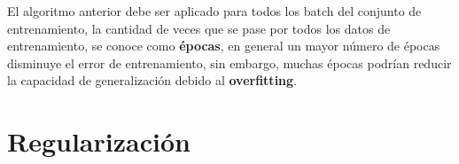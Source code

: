 \begin{remark}
	El algoritmo anterior debe ser aplicado para todos los batch del conjunto de entrenamiento, la cantidad de veces que se pase por todos los datos de entrenamiento, se conoce como \textbf{épocas}, en general un mayor número de épocas disminuye el error de entrenamiento, sin embargo, muchas épocas podrían reducir la capacidad de generalización debido al \textbf{overfitting}.	
\end{remark}

\section{Regularización}














